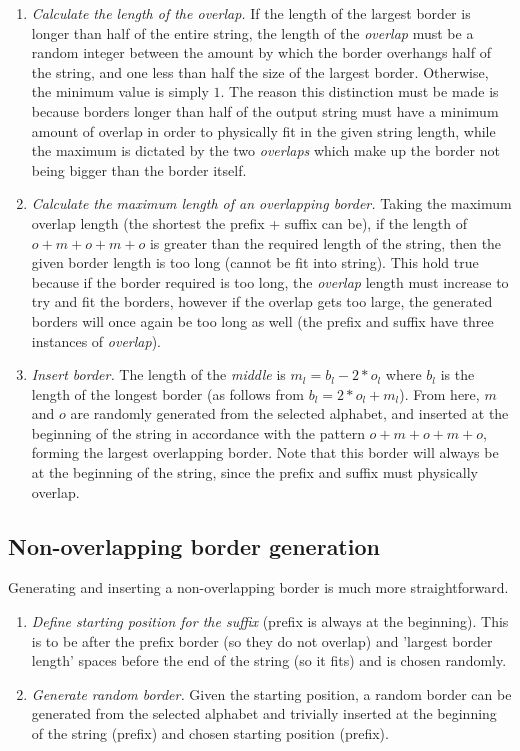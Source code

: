 \documentclass{l4proj}
\begin{document}
\begin{enumerate}[i]
	\item
	\emph{Calculate the length of the overlap.} If the length of the largest border is longer than half of the entire string, the length of the \emph{overlap} must be a random integer between the amount by which the border overhangs half of the string, and one less than half the size of the largest border. Otherwise, the minimum value is simply $1$. The reason this distinction must be made is because borders longer than half of the output string must have a minimum amount of overlap in order to physically fit in the given string length, while the maximum is dictated by the two \emph{overlaps} which make up the border not being bigger than the border itself.

	\item
	 \emph{Calculate the maximum length of an overlapping border.} Taking the maximum overlap length (the shortest the prefix + suffix can be), if the length of $o+m+o+m+o$ is greater than the required length of the string, then the given border length is too long (cannot be fit into string). This hold true because if the border required is too long, the \emph{overlap} length must increase to try and fit the borders, however if the overlap gets too large, the generated borders will once again be too long as well (the prefix and suffix have three instances of \emph{overlap}).

\item
\emph{Insert border.} The length of the \emph{middle} is $m_l = b_l - 2 * o_l$ where $b_l$ is the length of the longest border (as follows from $b_l = 2 * o_l + m_l$). From here, $m$ and $o$ are randomly generated from the selected alphabet, and inserted at the beginning of the string in accordance with the pattern $o+m+o+m+o$, forming the largest overlapping border. Note that this border will always be at the beginning of the string, since the prefix and suffix must physically overlap.
\end{enumerate}

\subsection{Non-overlapping border generation}
\label{sec:nob}

Generating and inserting a non-overlapping border is much more straightforward. 
\begin{enumerate}[i]
	\item
	\emph{Define starting position for the suffix} (prefix is always at the beginning). This is to be after the prefix border (so they do not overlap) and 'largest border length' spaces before the end of the string (so it fits) and is chosen randomly. 
	\item
	\emph{Generate random border.} Given the starting position, a random border can be generated from the selected alphabet and trivially inserted at the beginning of the string (prefix) and chosen starting position (prefix). 
\end{enumerate}
\end{document}
